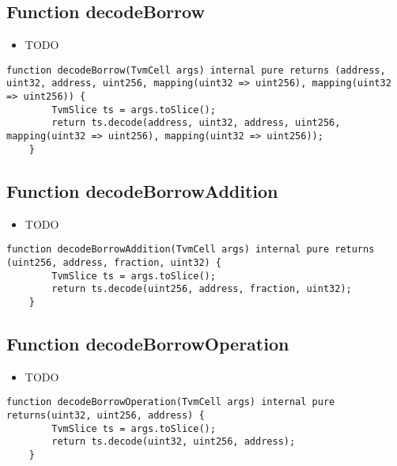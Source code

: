\subsection{Function decodeBorrow}

\noindent\begin{itemize}
\item TODO
\end{itemize}

\begin{lstlisting}[firstnumber=66]
    function decodeBorrow(TvmCell args) internal pure returns (address, uint32, address, uint256, mapping(uint32 => uint256), mapping(uint32 => uint256)) {
        TvmSlice ts = args.toSlice();
        return ts.decode(address, uint32, address, uint256, mapping(uint32 => uint256), mapping(uint32 => uint256));
    }
\end{lstlisting}

\subsection{Function decodeBorrowAddition}

\noindent\begin{itemize}
\item TODO
\end{itemize}

\begin{lstlisting}[firstnumber=83]
    function decodeBorrowAddition(TvmCell args) internal pure returns (uint256, address, fraction, uint32) {
        TvmSlice ts = args.toSlice();
        return ts.decode(uint256, address, fraction, uint32);
    }
\end{lstlisting}

\subsection{Function decodeBorrowOperation}

\noindent\begin{itemize}
\item TODO
\end{itemize}

\begin{lstlisting}[firstnumber=48]
    function decodeBorrowOperation(TvmCell args) internal pure returns(uint32, uint256, address) {
        TvmSlice ts = args.toSlice();
        return ts.decode(uint32, uint256, address);
    }
\end{lstlisting}

